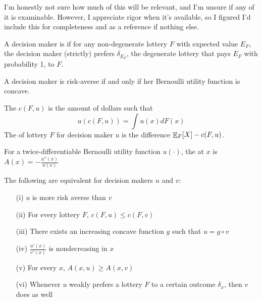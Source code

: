 \documentclass[12pt]{article}
\begin{document}
\begin{remark}
	I'm honestly not sure how much of this will be relevant, and I'm unsure if any of it is examinable. However, I appreciate rigor when it's available, so I figured I'd include this for completeness and as a reference if nothing else.
\end{remark}

\begin{definition}
	A decision maker is  if for any non-degenerate lottery $F$ with expected value $E_F$, the decision maker (strictly) prefers $\delta_{E_F}$, the degenerate lottery that pays $E_F$ with probability 1, to $F$.
\end{definition}

\begin{proposition}
	A decision maker is risk-averse if and only if her Bernoulli utility function is concave.
\end{proposition}

\begin{definition}
	The  $c(F,u)$ is the amount of dollars such that
	\[
	u(c(F,u)) = \int u(x)dF(x)
	\]
	The  of lottery $F$ for decision maker $u$ is the difference $\mathop{\mathbb{E}}_F[X] - c(F,u)$.
\end{definition}

\begin{definition}
	For a twice-differentiable Bernoulli utility function $u(\cdot)$, the  at $x$ is $A(x) = -\frac{u''(x)}{u(x)}$
\end{definition}

\begin{proposition}
	The following are equivalent for decision makers $u$ and $v$:
	\begin{itemize}
		\item[(i)] $u$ is more risk averse than $v$
		\item[(ii)] For every lottery $F$, $c(F,u) \le c(F,v)$
		\item[(iii)] There exists an increasing concave function $g$ such that $u = g \circ v$
		\item[(iv)] $\frac{u'(x)}{v'(x)}$ is nondecreasing in $x$
		\item[(v)] For every $x$, $A(x,u) \ge A(x,v)$
		\item[(vi)] Whenever $u$ weakly prefers a lottery $F$ to a certain outcome $\delta_x$, then $v$ does as well
	\end{itemize}
\end{proposition}
\end{document}
